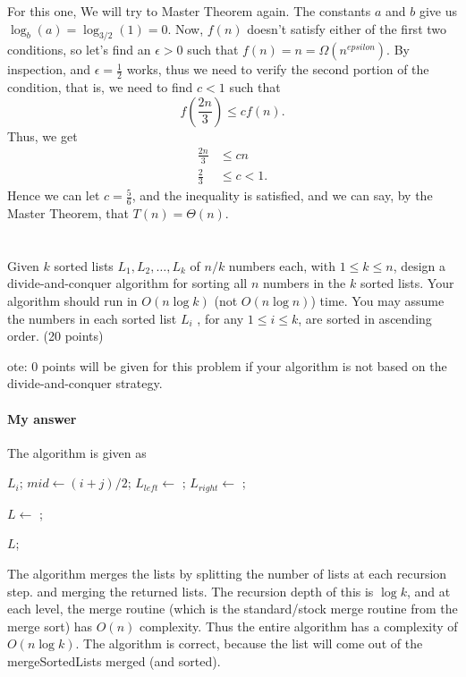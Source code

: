 \documentclass{article}
\begin{document}
\begin{enumerate}[label=(\alph*)]
   For this one, We will try to Master Theorem again. 
   The constants $a$ and $b$ give us $\log_b(a) = \log_{3/2}(1) = 0$.
   Now, $f(n)$ doesn't satisfy either of the first two conditions, so
   let's find an $\epsilon > 0$ such that $f(n) = n =
   \Omega(n^{epsilon})$.  By inspection, and $\epsilon = \frac{1}{2}$
   works, thus we need to verify the second portion of the condition,
   that is, we need to find $c<1$ such that 
   \begin{equation}
     f\left(\frac{2n}{3}\right) \le cf(n).
   \end{equation}
   Thus, we get
   \begin{equation}
     \begin{split}
       \frac{2n}{3} &\le cn\\
       \frac{2}{3} & \le c < 1.
     \end{split}
   \end{equation}
   Hence we can let $c = \frac{5}{6}$, and the inequality is
   satisfied, and we can say, by the Master Theorem, that $T(n) =
   \Theta(n)$. 
 \end{enumerate}


\section{}
 Given $k$ sorted lists $L_1 ,L_2 ,\dots ,L_k$ of $n/k$ numbers each,
 with $1 \le k \le n$, design a divide-and-conquer algorithm for
 sorting all $n$ numbers in the $k$ sorted lists. Your algorithm
should run in $O(n\log k)$ (not $O(n\log n)$) time. You may assume
 the numbers in each sorted list $L_i$ , for any $1 \le i \le k$, are
 sorted in ascending order. (20 points) 

ote: 0 points will be given for this problem if your algorithm is not
based on the divide-and-conquer strategy. 

\paragraph{My answer}

The algorithm is given as
{\singlespacing
\begin{algorithmic}

    \Return $L_i$;
  \EndIf
  \State $mid \gets (i+j)/2$;
  \State $L_{left} \gets $  ;
  \State $L_{right} \gets $ ;

  \State $L \gets $ ;

  \Return $L$;
\EndFunction
\end{algorithmic}
} %
  
The algorithm merges the lists by splitting the number of lists at
each recursion step. and merging the returned lists.  The recursion
depth of this is $\log k$, and at each level, the {\sc merge} routine
(which  
is the standard/stock merge routine from the merge sort) has
$O(n)$ complexity.  Thus the entire algorithm has a complexity of 
$O(n\log k)$.  The algorithm is correct, because the list will come
out of the {\sc mergeSortedLists} merged (and sorted).
\end{document}
